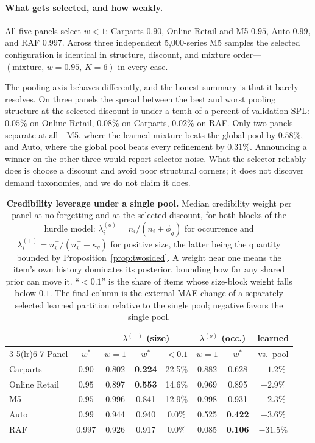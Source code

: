\paragraph{What gets selected, and how weakly.}
All five panels select $w<1$: Carparts $0.90$, Online Retail and M5
$0.95$, Auto $0.99$, and RAF $0.997$. Across three independent
5{,}000-series M5 samples the selected configuration is identical in
structure, discount, and mixture order---$(\text{mixture},\,w{=}0.95,\,
K{=}6)$ in every case.

The pooling axis behaves differently, and the honest summary is that it
barely resolves. On three panels the spread between the best and worst
pooling structure at the selected discount is under a tenth of a percent
of validation SPL: $0.05\%$ on Online Retail, $0.08\%$ on Carparts,
$0.02\%$ on RAF. Only two panels separate at all---M5, where the learned
mixture beats the global pool by $0.58\%$, and Auto, where the global pool
beats every refinement by $0.31\%$. Announcing a winner on the other three
would report selector noise. What the selector reliably does is choose a
discount and avoid poor structural corners; it does not discover demand
taxonomies, and we do not claim it does.

\begin{table}[t]
\centering
\caption{\textbf{Credibility leverage under a single pool.} Median
credibility weight per panel at no forgetting and at the selected
discount, for both blocks of the hurdle model:
$\lambda^{(o)}_i=n_i/(n_i+\phi_g)$ for occurrence and
$\lambda^{(+)}_i=n_i^{+}/(n_i^{+}+\kappa_g)$ for positive size, the
latter being the quantity bounded by Proposition~\ref{prop:twosided}.
A weight near one means the item's own history dominates its posterior,
bounding how far any shared prior can move it. ``$<0.1$'' is the share of
items whose size-block weight falls below $0.1$. The final column is the
external MAE change of a separately selected learned partition relative to
the single pool; negative favors the single pool.}
\label{tab:leverage}
\small
\setlength{\tabcolsep}{3.0pt}
\begin{tabular}{lccccccc}
\toprule
 & & \multicolumn{3}{c}{$\lambda^{(+)}$ (size)} & \multicolumn{2}{c}{$\lambda^{(o)}$ (occ.)} & learned\\
\cmidrule(lr){3-5}\cmidrule(lr){6-7}
Panel & $w^{*}$ & $w{=}1$ & $w^{*}$ & $<0.1$ & $w{=}1$ & $w^{*}$ & vs.\ pool\\
\midrule
Carparts & $0.90$ & 0.802 & \textbf{0.224} & 22.5\% & 0.882 & 0.628 & $-1.2\%$\\
Online Retail & $0.95$ & 0.897 & \textbf{0.553} & 14.6\% & 0.969 & 0.895 & $-2.9\%$\\
M5 & $0.95$ & 0.996 & 0.841 & 12.9\% & 0.998 & 0.931 & $-2.3\%$\\
Auto & $0.99$ & 0.944 & 0.940 & 0.0\% & 0.525 & \textbf{0.422} & $-3.6\%$\\
RAF & $0.997$ & 0.926 & 0.917 & 0.0\% & 0.085 & \textbf{0.106} & $-31.5\%$\\
\bottomrule
\end{tabular}
\end{table}

